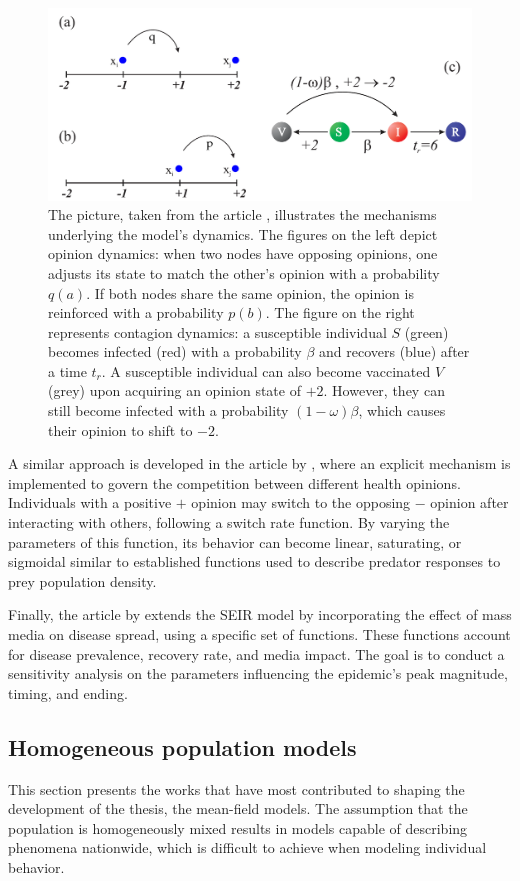\begin{figure}[h]
	\centering
	\includegraphics[width=0.8\linewidth]{0_introduction/images_review/alvarez_opi_vac}
	\caption[Rules in opinion disease model]{The picture, taken from the article \cite{Alvarez_Zuzek_2017}, illustrates the mechanisms underlying the model's dynamics. The figures on the left depict opinion dynamics: when two nodes have opposing opinions, one adjusts its state to match the other's opinion with a probability $q(a)$. If both nodes share the same opinion, the opinion is reinforced with a probability $p(b)$. The figure on the right represents contagion dynamics: a susceptible individual $S$ (green) becomes infected (red) with a probability $\beta$ and recovers (blue) after a time $t_r$. A susceptible individual can also become vaccinated $V$ (grey) upon acquiring an opinion state of $+2$. However, they can still become infected with a probability $(1-\omega) \beta$, which causes their opinion to shift to $-2$. }
	\label{fig:alvarez_opi_vac}
\end{figure}

A similar approach is developed in the article by \cite{teslya2022}, where an explicit mechanism is implemented to govern the competition between different health opinions. Individuals with a positive $+$ opinion may switch to the opposing $-$ opinion after interacting with others, following a switch rate function. By varying the parameters of this function, its behavior can become linear, saturating, or sigmoidal similar to established functions used to describe predator responses to prey population density.

Finally, the article by \cite{Collinson2014} extends the SEIR model by incorporating the effect of mass media on disease spread, using a specific set of functions. These functions account for disease prevalence, recovery rate, and media impact. The goal is to conduct a sensitivity analysis on the parameters influencing the epidemic's peak magnitude, timing, and ending. 


\subsection{Homogeneous population models}
\label{subsec:homogeneous}
This section presents the works that have most contributed to shaping the development of the thesis, the mean-field models. The assumption that the population is homogeneously mixed results in models capable of describing phenomena nationwide, which is difficult to achieve when modeling individual behavior.

